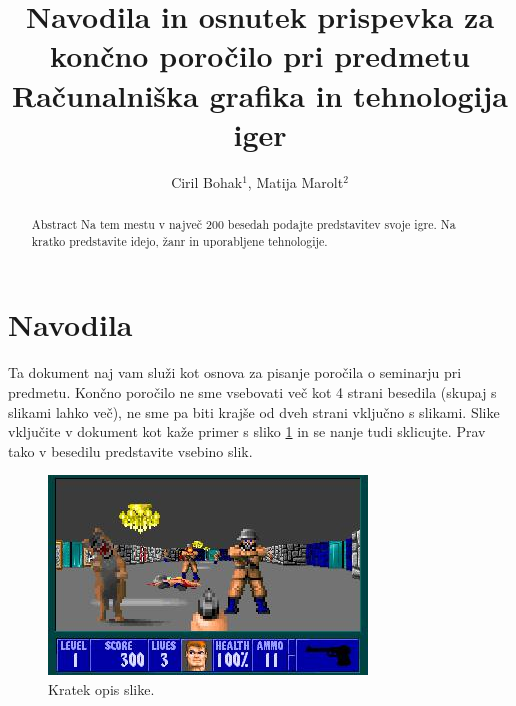 \documentclass[a4paper]{article}
\begin{document}
\title{Navodila in osnutek prispevka za končno poročilo pri predmetu Računalniška grafika in tehnologija iger}

\author{Ciril Bohak$^{1}$, Matija Marolt$^{2}$} %



\maketitle


\begin{abstract}{Abstract}
Na tem mestu v največ 200 besedah podajte predstavitev svoje igre. Na kratko predstavite idejo, žanr in {upo\-ra\-blje\-ne} tehnologije.
\end{abstract}

\section*{Navodila}
Ta dokument naj vam služi kot osnova za pisanje poročila o seminarju pri predmetu. Končno poročilo ne sme vsebovati več kot 4 strani besedila (skupaj s slikami lahko več), ne sme pa biti krajše od dveh strani vključno s slikami. Slike vključite v dokument kot kaže primer s sliko \ref{fig:slika} in se nanje tudi sklicujte. Prav tako v besedilu predstavite vsebino slik.

\begin{figure}[!htb]
    \begin{center}
        \includegraphics[width=\columnwidth]{wolfenstein.jpg}
        \caption{Kratek opis slike.} \label{fig:slika}
    \end{center}
\end{figure}
\end{document}
